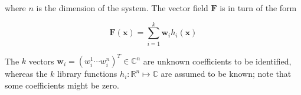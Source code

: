 \documentclass{article}
\begin{document}
    where $n$ is the dimension of the system. The vector field $\mathbf{F}$ is in turn of the form

    \begin{equation}
        \mathbf{F}(\mathbf{x}) = \sum_{i = 1}^{k} \mathbf{w}_i h_i \left( \mathbf{x} \right)
    \end{equation}

    The $k$ vectors $\mathbf{w}_i = \left( w_i^1 \cdots w_i^n \right)^T \in \mathbb{C}^n$ are unknown coefficients to be identified, whereas the $k$ library functions $h_i : \mathbb{R}^n \mapsto \mathbb{C}$ are assumed to be known; note that some coefficients might be zero.



    
\end{document}
